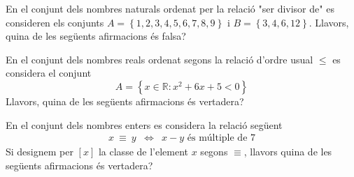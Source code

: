 \begin{enumerate}
\pregunta En el conjunt dels nombres naturals ordenat per la relació "ser
divisor de" es consideren els conjunts $A=\left\{ 1,2,3,4,5,6,7,8,9\right\} $ i
$B=\left\{ 3,4,6,12\right\} $. Llavors, quina de les següents afirmacions
és falsa?

\begin{enumerate}
\end{enumerate}
\feedback

\pregunta En el conjunt dels nombres reals ordenat segons la relació d'ordre
usual $\leq$ es considera el conjunt%
\begin{equation*}
A=\left\{ x\in\mathbb{R}:x^{2}+6x+5<0\right\}
\end{equation*}
Llavors, quina de les següents afirmacions és vertadera?

\begin{enumerate}
\end{enumerate}
\feedback

\pregunta En el conjunt dels nombres enters es considera la relació següent%
\begin{equation*}
\begin{array}{ccc}
x~\equiv~y & \Longleftrightarrow & x-y\text{ és múltiple de }7%
\end{array}%
\end{equation*}
Si designem per $\left[ x\right] $ la classe de l'element $x$ segons $\equiv$, llavors quina de les següents afirmacions és vertadera?

\begin{enumerate}
\end{enumerate}
\feedback
\end{enumerate}
